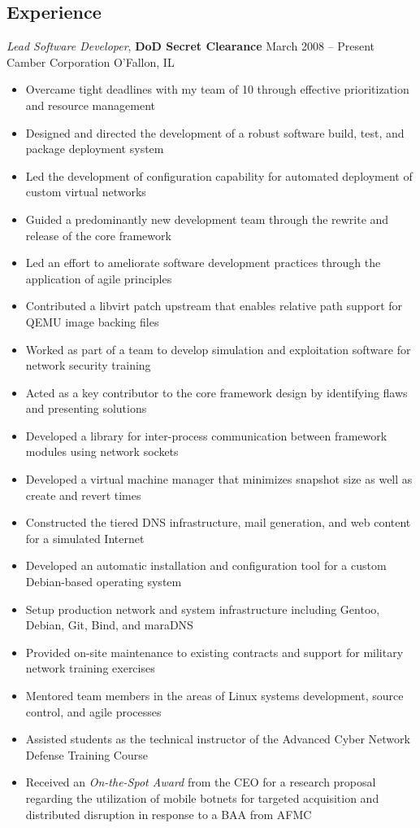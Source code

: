 \documentclass[margin,line]{resume}
\begin{document}
\begin{resume}
\section{Experience}

{\sl Lead Software Developer}, \textbf{\small DoD Secret Clearance}   \hfill  March 2008 -- Present\\
Camber Corporation                                                    \hfill  O'Fallon, IL
\begin{itemize} \itemsep -2pt %
\small\item Overcame tight deadlines with my team of 10 through effective prioritization and resource management
\small\item Designed and directed the development of a robust software build, test, and package deployment system
\small\item Led the development of configuration capability for automated deployment of custom virtual networks
\small\item Guided a predominantly new development team through the rewrite and release of the core framework
\small\item Led an effort to ameliorate software development practices through the application of agile principles
\small\item Contributed a libvirt patch upstream that enables relative path support for QEMU image backing files
\small\item Worked as part of a team to develop simulation and exploitation software for network security training
\small\item Acted as a key contributor to the core framework design by identifying flaws and presenting solutions
\small\item Developed a library for inter-process communication between framework modules using network sockets
\small\item Developed a virtual machine manager that minimizes snapshot size as well as create and revert times
\small\item Constructed the tiered DNS infrastructure, mail generation, and web content for a simulated Internet
\small\item Developed an automatic installation and configuration tool for a custom Debian-based operating system
\small\item Setup production network and system infrastructure including Gentoo, Debian, Git, Bind, and maraDNS
\small\item Provided on-site maintenance to existing contracts and support for military network training exercises
\small\item Mentored team members in the areas of Linux systems development, source control, and agile processes
\small\item Assisted students as the technical instructor of the Advanced Cyber Network Defense Training Course
\small\item Received an {\sl On-the-Spot Award} from the CEO for a research proposal regarding the utilization of
            mobile botnets for targeted acquisition and distributed disruption in response to a BAA from AFMC


\end{itemize}
\end{resume}
\end{document}

